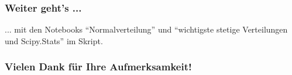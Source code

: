 \begin{frame}
  \frametitle{Weiter geht's ...}
  ... mit den Notebooks ``Normalverteilung'' und ``wichtigste stetige Verteilungen und Scipy.Stats'' im Skript.
\end{frame}

\begin{frame}[separator]
  \frametitle{Vielen Dank für Ihre Aufmerksamkeit!}
\end{frame}



